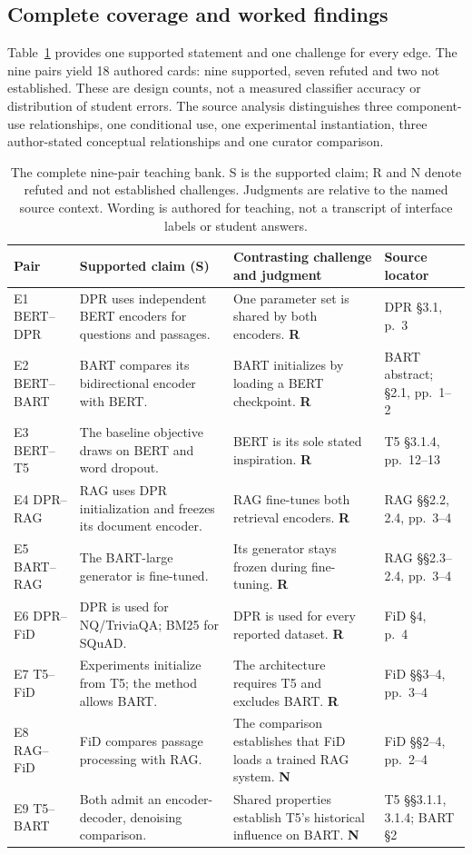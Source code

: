 \subsection{Complete coverage and worked findings}
Table~\ref{tab:claims} provides one supported statement and one challenge for every edge. The nine pairs yield 18 authored cards: nine supported, seven refuted and two not established. These are design counts, not a measured classifier accuracy or distribution of student errors. The source analysis distinguishes three component-use relationships, one conditional use, one experimental instantiation, three author-stated conceptual relationships and one curator comparison.

\begin{table}[t]
\caption{The complete nine-pair teaching bank. S is the supported claim; R and N denote refuted and not established challenges. Judgments are relative to the named source context. Wording is authored for teaching, not a transcript of interface labels or student answers.}
\label{tab:claims}
\begin{tabular}{@{}p{}p{}p{}p{}@{}}
\toprule
Pair & Supported claim (S) & Contrasting challenge and judgment & Source locator\\
\midrule
E1 BERT--DPR & DPR uses independent BERT encoders for questions and passages. & One parameter set is shared by both encoders. \textbf{R} & DPR \S3.1, p.\ 3~\cite{dpr}\\
E2 BERT--BART & BART compares its bidirectional encoder with BERT. & BART initializes by loading a BERT checkpoint. \textbf{R} & BART abstract; \S2.1, pp.\ 1--2~\cite{bart}\\
E3 BERT--T5 & The baseline objective draws on BERT and word dropout. & BERT is its sole stated inspiration. \textbf{R} & T5 \S3.1.4, pp.\ 12--13~\cite{t5}\\
E4 DPR--RAG & RAG uses DPR initialization and freezes its document encoder. & RAG fine-tunes both retrieval encoders. \textbf{R} & RAG \S\S2.2, 2.4, pp.\ 3--4~\cite{rag}\\
E5 BART--RAG & The BART-large generator is fine-tuned. & Its generator stays frozen during fine-tuning. \textbf{R} & RAG \S\S2.3--2.4, pp.\ 3--4~\cite{rag}\\
E6 DPR--FiD & DPR is used for NQ/TriviaQA; BM25 for SQuAD. & DPR is used for every reported dataset. \textbf{R} & FiD \S4, p.\ 4~\cite{fid}\\
E7 T5--FiD & Experiments initialize from T5; the method allows BART. & The architecture requires T5 and excludes BART. \textbf{R} & FiD \S\S3--4, pp.\ 3--4~\cite{fid}\\
E8 RAG--FiD & FiD compares passage processing with RAG. & The comparison establishes that FiD loads a trained RAG system. \textbf{N} & FiD \S\S2--4, pp.\ 2--4~\cite{fid}\\
E9 T5--BART & Both admit an encoder-decoder, denoising comparison. & Shared properties establish T5's historical influence on BART. \textbf{N} & T5 \S\S3.1.1, 3.1.4; BART \S2~\cite{t5,bart}\\
\bottomrule
\end{tabular}
\end{table}

